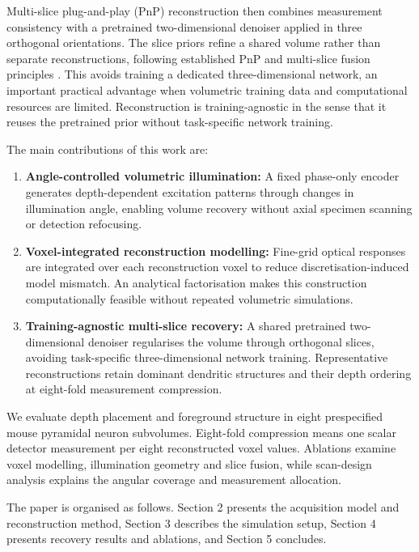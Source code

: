Multi-slice plug-and-play (PnP) reconstruction then combines measurement consistency with a pretrained two-dimensional denoiser applied in three orthogonal orientations. The slice priors refine a shared volume rather than separate reconstructions, following established PnP and multi-slice fusion principles \cite{venkat2013,majee2021}. This avoids training a dedicated three-dimensional network, an important practical advantage when volumetric training data and computational resources are limited. Reconstruction is training-agnostic in the sense that it reuses the pretrained prior without task-specific network training.

The main contributions of this work are:

\begin{enumerate}
\item \textbf{Angle-controlled volumetric illumination:} A fixed phase-only encoder generates depth-dependent excitation patterns through changes in illumination angle, enabling volume recovery without axial specimen scanning or detection refocusing.
\item \textbf{Voxel-integrated reconstruction modelling:} Fine-grid optical responses are integrated over each reconstruction voxel to reduce discretisation-induced model mismatch. An analytical factorisation makes this construction computationally feasible without repeated volumetric simulations.
\item \textbf{Training-agnostic multi-slice recovery:} A shared pretrained two-dimensional denoiser regularises the volume through orthogonal slices, avoiding task-specific three-dimensional network training. Representative reconstructions retain dominant dendritic structures and their depth ordering at eight-fold measurement compression.
\end{enumerate}

We evaluate depth placement and foreground structure in eight prespecified mouse pyramidal neuron subvolumes. Eight-fold compression means one scalar detector measurement per eight reconstructed voxel values. Ablations examine voxel modelling, illumination geometry and slice fusion, while scan-design analysis explains the angular coverage and measurement allocation.

The paper is organised as follows. Section 2 presents the acquisition model and reconstruction method, Section 3 describes the simulation setup, Section 4 presents recovery results and ablations, and Section 5 concludes.
